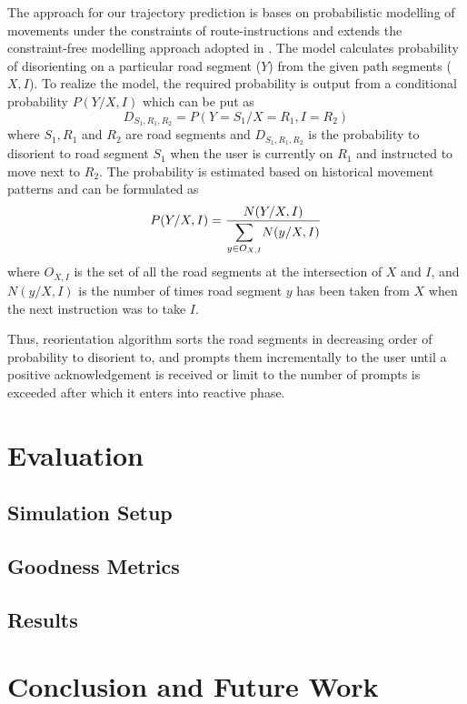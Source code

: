 \documentclass{iitkthesis}
\begin{document}
The approach for our trajectory prediction is bases on probabilistic modelling of movements under the constraints of route-instructions and extends the constraint-free modelling approach adopted in \cite{liu}. The model calculates probability of disorienting on a particular road segment ($Y$) from the given path segments ($X,I$). To realize the model, the required probability is output from a conditional probability $P(Y/X,I)$ which can be put as
%
$$D_{S_1,R_1,R_2} = P(Y=S_1/X=R_1,I=R_2)$$
%
where $S_1,R_1$ and $R_2$ are road segments and $D_{S_1,R_1,R_2}$ is the probability to disorient to road segment $S_1$ when the user is currently on $R_1$ and instructed to move next to $R_2$. The probability is estimated based on historical movement patterns and can be formulated as
%
\[ \displaystyle P(Y/X,I) = \frac{N(Y/X,I)}{ \mathlarger{\sum}\limits_{y \in O_{X,I}} N(y/X,I)} \] 
%
where $O_{X,I}$ is the set of all the road segments at the intersection of $X$ and $I$, and $N(y/X,I)$ is the number of times road segment $y$ has been taken from $X$ when the next instruction was to take $I$. 

Thus, reorientation algorithm sorts the road segments in decreasing order of probability to disorient to, and prompts them incrementally to the user until a positive acknowledgement is received or limit to the number of prompts is exceeded after which it enters into reactive phase.

\iffalse
$$
\begin{bmatrix}
P(X_2=R_1/X_1=R_1,I=R_1) & P(X_2=R_1/X_1=R_1,I=R_1) & \cdots & P(X_2=R_1/X_1=R_1,I=R_1)\\
P(X_2=R_1/X_1=R_1,I=R_1) & P(X_2=R_1/X_1=R_1,I=R_1) & \cdots & P(X_2=R_1/X_1=R_1,I=R_1)\\
\vdots& \vdots& \cdots& \vdots\\ 
P(X_2=R_1/X_1=R_1,I=R_1) & P(X_2=R_1/X_1=R_1,I=R_1) & \cdots &P(X_2=R_1/X_1=R_1,I=R_1)\\
\end{bmatrix}
$$
\fi
 \chapter{Evaluation}
 \label{evaluation}

 \section{Simulation Setup}
 \section{Goodness Metrics}
 \section{Results}
 \chapter{Conclusion and Future Work}


\end{document}
